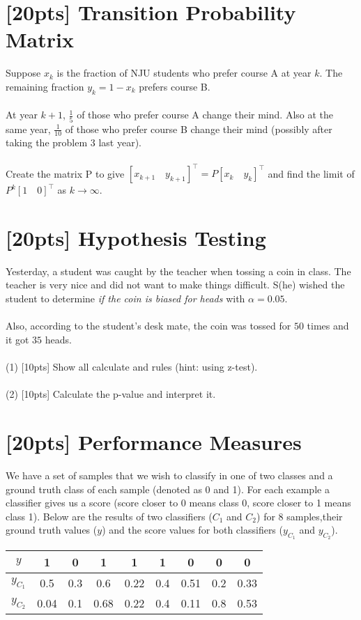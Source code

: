 \documentclass{article}
\begin{document}
	\section{[20pts] Transition Probability Matrix}
	Suppose $x_k$ is the fraction of NJU students who prefer course A at year $k$. The remaining fraction $y_k = 1-x_k$ prefers course B. \\\\
	At year $k + 1$, $\frac{1}{5}$ of those who prefer course A change their mind. Also at the same year, $\frac{1}{10}$ of those who prefer course B change their mind (possibly after taking the problem 3 last year). \\ \\ 
	Create the matrix P to give $[x_{k+1}\quad y_{k+1}]^\top = P [x_k\quad y_k]^\top$ and find the limit of $P^k[1\quad 0]^\top$ as $k \rightarrow \infty$.
	
	\section{[20pts] Hypothesis Testing}
	Yesterday, a student was caught by the teacher when tossing a coin in class. The teacher is very nice and did not want to make things difficult. S(he) wished the student to determine \emph{if the coin is biased for heads} with $\alpha = 0.05$.\\ \\
	Also, according to the student’s desk mate, the coin was tossed for $50$ times and it got $35$ heads. \\ \\
	(1) [10pts] Show all calculate and rules (hint: using z-test). \\ \\
	(2) [10pts] Calculate the p-value and interpret it.
	
	\section{[20pts] Performance Measures}
	We have a set of samples that we wish to classify in one of two classes and a ground truth class of each sample (denoted as 0 and 1). For each example a classifier gives us a score (score closer to 0 means class 0, score closer to 1 means class 1). Below are the results of two classifiers ($C_1$ and $C_2$) for 8 samples,their ground truth values ($y$) and the score values for both classifiers ($y_{C_1}$ and $y_{C_2}$).
	\begin{table}[htbp]
		\centering
		\begin{tabular}{c|cccccccc}
			\hline
			$y$ & 1 & 0 & 1 & 1 & 1 & 0 & 0 & 0\\
			\hline
			$y_{C_1}$ & 0.5 & 0.3 & 0.6 & 0.22 & 0.4 & 0.51 & 0.2 & 0.33\\
			\hline
			$y_{C_2}$ & 0.04 & 0.1 & 0.68 & 0.22 & 0.4 & 0.11 & 0.8 & 0.53\\
			\hline
		\end{tabular}
	\end{table}
	
\end{document}
